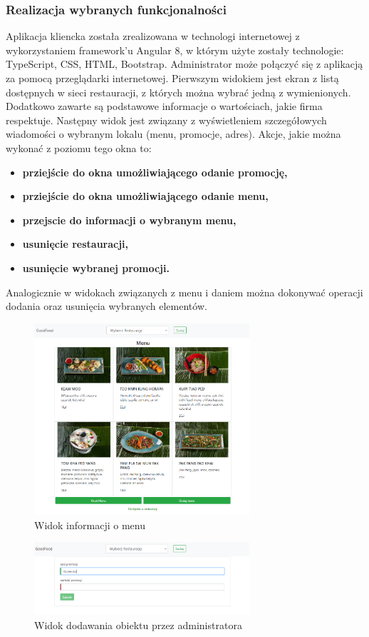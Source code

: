 \documentclass{article}
\begin{document}
		\subsubsection{Realizacja wybranych funkcjonalności}
		Aplikacja kliencka została zrealizowana w technologi internetowej z wykorzystaniem framework'u Angular 8, w którym użyte zostały technologie:  TypeScript, CSS, HTML, Bootstrap. Administrator może połączyć się z aplikacją za pomocą przeglądarki internetowej. Pierwszym widokiem jest ekran z listą dostępnych w sieci restauracji, z których można wybrać jedną z wymienionych. Dodatkowo zawarte są podstawowe informacje o wartościach, jakie firma respektuje. Następny widok jest związany z wyświetleniem szczegółowych wiadomości o wybranym lokalu (menu, promocje, adres). Akcje, jakie można wykonać z poziomu tego okna to:
		\newpage
		\begin{itemize}
				\item
					\textbf{prziejście do okna umożliwiającego odanie promocję,} 
				\item
					\textbf{prziejście do okna umożliwiającego odanie menu,}
				\item
					\textbf{przejscie do informacji o wybranym menu,}
				\item
					\textbf{usunięcie restauracji,}
				\item
					\textbf{usunięcie wybranej promocji.}
			\end{itemize}
			Analogicznie w widokach związanych z menu i daniem można dokonywać operacji  dodania oraz usunięcia wybranych elementów.

			\begin{figure}[hbt!]
				\includegraphics[width=8cm]{Files/Pictures/MenuList_A}
				\centering
				\caption{Widok informacji o menu}
			\end{figure}

			\begin{figure}[hbt!]
				\includegraphics[width=8cm]{Files/Pictures/Add_A}
				\centering
				\caption{Widok dodawania obiektu przez administratora}
			\end{figure}
	
\end{document}
